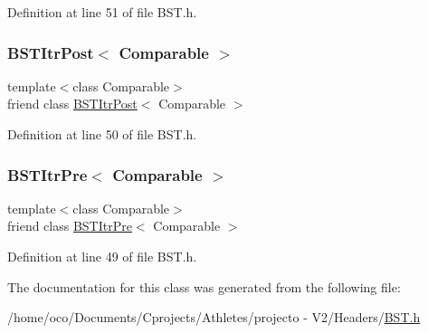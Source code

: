 Definition at line 51 of file B\+S\+T.\+h.

\hypertarget{class_binary_node_a5dc153694be266f6e772659486219da7}{}\label{class_binary_node_a5dc153694be266f6e772659486219da7} 
\subsubsection{\texorpdfstring{B\+S\+T\+Itr\+Post$<$ Comparable $>$}{BSTItrPost< Comparable >}}
{\footnotesize\ttfamily template$<$class Comparable$>$ \\
friend class \hyperlink{class_b_s_t_itr_post}{B\+S\+T\+Itr\+Post}$<$ Comparable $>$\hspace{0.3cm}{\ttfamily [friend]}}



Definition at line 50 of file B\+S\+T.\+h.

\hypertarget{class_binary_node_a45a55df6f11541416d4ea7684c575c1a}{}\label{class_binary_node_a45a55df6f11541416d4ea7684c575c1a} 
\subsubsection{\texorpdfstring{B\+S\+T\+Itr\+Pre$<$ Comparable $>$}{BSTItrPre< Comparable >}}
{\footnotesize\ttfamily template$<$class Comparable$>$ \\
friend class \hyperlink{class_b_s_t_itr_pre}{B\+S\+T\+Itr\+Pre}$<$ Comparable $>$\hspace{0.3cm}{\ttfamily [friend]}}



Definition at line 49 of file B\+S\+T.\+h.



The documentation for this class was generated from the following file\+:\begin{DoxyCompactItemize}
\item 
/home/oco/\+Documents/\+Cprojects/\+Athletes/projecto -\/ V2/\+Headers/\hyperlink{_b_s_t_8h}{B\+S\+T.\+h}\end{DoxyCompactItemize}
